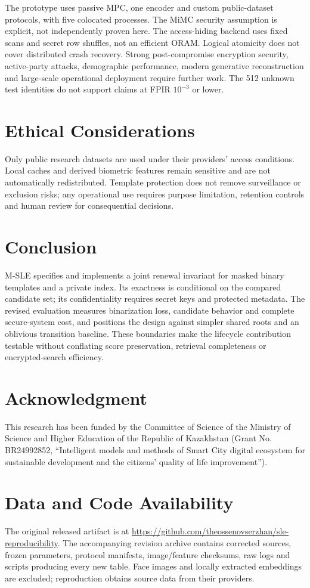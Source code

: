 \documentclass[journal]{IEEEtran}
\newcommand{\MSLE}{\textsc{M-SLE}\xspace}
\begin{document}
The prototype uses passive MPC, one encoder and custom public-dataset protocols, with five colocated processes. The MiMC security assumption is explicit, not independently proven here. The access-hiding backend uses fixed scans and secret row shuffles, not an efficient ORAM. Logical atomicity does not cover distributed crash recovery. Strong post-compromise encryption security, active-party attacks, demographic performance, modern generative reconstruction and large-scale operational deployment require further work. The 512 unknown test identities do not support claims at FPIR $10^{-3}$ or lower.

\section{Ethical Considerations}
Only public research datasets are used under their providers' access conditions. Local caches and derived biometric features remain sensitive and are not automatically redistributed. Template protection does not remove surveillance or exclusion risks; any operational use requires purpose limitation, retention controls and human review for consequential decisions.

\section{Conclusion}
\MSLE specifies and implements a joint renewal invariant for masked binary templates and a private index. Its exactness is conditional on the compared candidate set; its confidentiality requires secret keys and protected metadata. The revised evaluation measures binarization loss, candidate behavior and complete secure-system cost, and positions the design against simpler shared roots and an oblivious transition baseline. These boundaries make the lifecycle contribution testable without conflating score preservation, retrieval completeness or encrypted-search efficiency.

\section*{Acknowledgment}
This research has been funded by the Committee of Science of the Ministry of Science and Higher Education of the Republic of Kazakhstan (Grant No. BR24992852, ``Intelligent models and methods of Smart City digital ecosystem for sustainable development and the citizens' quality of life improvement'').
\section*{Data and Code Availability}
The original released artifact is at \url{https://github.com/theossenovserzhan/sle-reproducibility}. The accompanying revision archive contains corrected sources, frozen parameters, protocol manifests, image/feature checksums, raw logs and scripts producing every new table. Face images and locally extracted embeddings are excluded; reproduction obtains source data from their providers.


\end{document}
